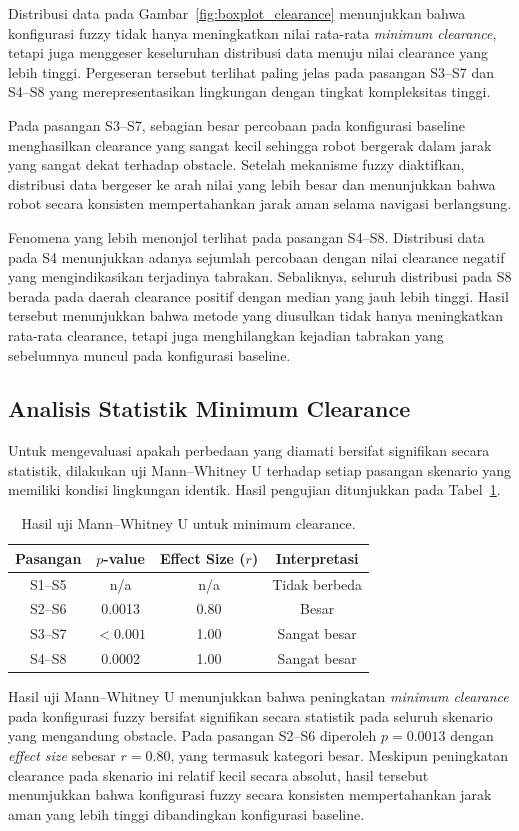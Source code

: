 Distribusi data pada Gambar~\ref{fig:boxplot_clearance} menunjukkan bahwa konfigurasi fuzzy tidak hanya meni\-ngkatkan nilai rata-rata \textit{minimum clearance}, tetapi juga menggeser keseluruhan distribusi data menuju nilai clearance yang lebih tinggi. Pergeseran tersebut terlihat paling jelas pada pasangan S3--S7 dan S4--S8 yang merepresentasikan lingkungan dengan tingkat kompleksitas tinggi.

Pada pasangan S3--S7, sebagian besar percobaan pada konfigurasi baseline menghasilkan clearance yang sangat kecil sehingga robot bergerak dalam jarak yang sangat dekat terhadap obstacle. Setelah mekanisme fuzzy diaktifkan, distribusi data bergeser ke arah nilai yang lebih besar dan menunjukkan bahwa robot secara konsisten mempertahankan jarak aman selama navigasi berlangsung.

Fenomena yang lebih menonjol terlihat pada pasangan S4--S8. Distribusi data pada S4 menunjukkan adanya sejumlah percobaan dengan nilai clearance negatif yang mengindikasikan terjadinya tabrakan. Sebaliknya, seluruh distribusi pada S8 berada pada daerah clearance positif dengan median yang jauh lebih tinggi. Hasil tersebut menunjukkan bahwa metode yang diusulkan tidak hanya meningkatkan rata-rata clearance, tetapi juga menghilangkan kejadian tabrakan yang sebelumnya muncul pada konfigurasi baseline.

\subsection{Analisis Statistik Minimum Clearance}

Untuk mengevaluasi apakah perbedaan yang diamati bersifat signifikan secara statistik, dilakukan uji Mann--Whitney U terhadap setiap pasangan skenario yang memiliki kondisi lingku\-ngan identik. Hasil pengujian ditunjukkan pada Tabel~\ref{tab:mw_clearance}.

\begin{table}[H]
\centering
\caption{Hasil uji Mann--Whitney U untuk minimum clearance.}
\label{tab:mw_clearance}
\begin{tabular}{cccc}
\toprule
Pasangan &
$p$-value &
Effect Size ($r$) &
Interpretasi \\
\midrule
S1--S5 & n/a & n/a & Tidak berbeda \\
S2--S6 & 0.0013 & 0.80 & Besar \\
S3--S7 & $<0.001$ & 1.00 & Sangat besar \\
S4--S8 & 0.0002 & 1.00 & Sangat besar \\
\bottomrule
\end{tabular}
\end{table}
Hasil uji Mann--Whitney U menunjukkan bahwa peningkatan
\textit{minimum clearance} pada konfigurasi fuzzy bersifat
signifikan secara statistik pada seluruh skenario yang
mengandung obstacle. Pada pasangan S2--S6 diperoleh
$p=0.0013$ dengan \textit{effect size} sebesar $r=0.80$,
yang termasuk kategori besar. Meskipun peningkatan
clearance pada skenario ini relatif kecil secara absolut,
hasil tersebut menunjukkan bahwa konfigurasi fuzzy secara
konsisten mempertahankan jarak aman yang lebih tinggi
dibandingkan konfigurasi baseline.

